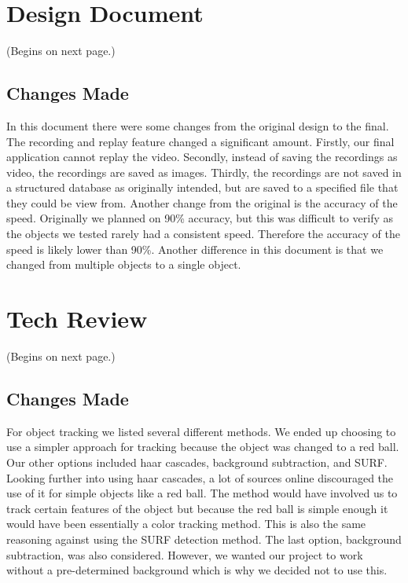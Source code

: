 \documentclass[onecolumn, draftclsnofoot,10pt, compsoc]{IEEEtran}
\begin{document}

\newpage
\section{Design Document}
(Begins on next page.)



\subsection{Changes Made}

In this document there were some changes from the original design to the final.
The recording and replay feature changed a significant amount.
Firstly, our final application cannot replay the video.
Secondly, instead of saving the recordings as video, the recordings are saved as images.
Thirdly, the recordings are not saved in a structured database as originally intended, but are saved to a specified file that they could be view from.
Another change from the original is the accuracy of the speed.
Originally we planned on 90\% accuracy, but this was difficult to verify as the objects we tested rarely had a consistent speed.
Therefore the accuracy of the speed is likely lower than 90\%.
Another difference in this document is that we changed from multiple objects to a single object.



\newpage
\section{Tech Review}
(Begins on next page.)



\subsection{Changes Made}
For object tracking we listed several different methods. We ended up choosing to use a simpler approach for tracking because the object was changed to a red ball. Our other options included haar cascades, background subtraction, and SURF. Looking further into using haar cascades, a lot of sources online discouraged the use of it for simple objects like a red ball. The method would have involved us to track certain features of the object but because the red ball is simple enough it would have been essentially a color tracking method. This is also the same reasoning against using the SURF detection method. The last option, background subtraction, was also considered. However, we wanted our project to work without a pre-determined background which is why we decided not to use this.
\end{document}
